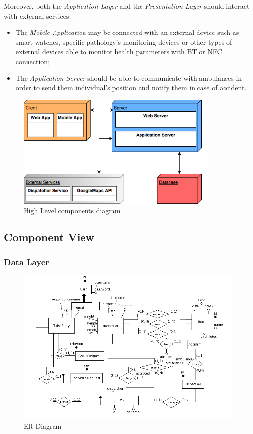 \documentclass[a4paper]{article}
\begin{document}
Moreover, both the \textit{Application Layer} and the \textit{Presentation Layer} should interact with external services:
\begin{itemize}
    \item The \textit{Mobile Application} may be connected with an external device such as smart-watches, specific pathology's monitoring devices or other types of external devices able to monitor health parameters with BT or NFC connection;
    \item The \textit{Application Server} should be able to communicate with ambulances in order to send them individual's position and notify them in case of accident.
\end{itemize}
\hfill
\begin{figure}[!htpb]
    	\centering
    	\includegraphics[width=100mm,keepaspectratio]{images/highlevel2.png}
    	\caption{High Level components diagram}
\end{figure}
\hfill
\newpage
\subsection{Component View}
    
    \subsubsection{Data Layer}
    \begin{figure}[!htpb]
        \centering
        \includegraphics[width=\textwidth,keepaspectratio]{DD/images/er_diagram.png}
        \caption{ER Diagram}
        \label{fig:ER_trackme}
    \end{figure}
    
\end{document}
